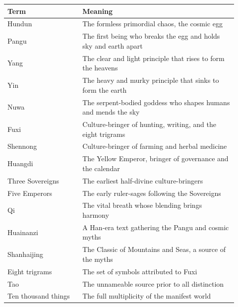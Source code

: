 \begin{longtable}{L{0.30\linewidth} L{0.62\linewidth}}
\toprule
\textbf{Term} & \textbf{Meaning} \\
\midrule
\endhead
Hundun & The formless primordial chaos, the cosmic egg \\
Pangu & The first being who breaks the egg and holds sky and earth apart \\
Yang & The clear and light principle that rises to form the heavens \\
Yin & The heavy and murky principle that sinks to form the earth \\
Nuwa & The serpent-bodied goddess who shapes humans and mends the sky \\
Fuxi & Culture-bringer of hunting, writing, and the eight trigrams \\
Shennong & Culture-bringer of farming and herbal medicine \\
Huangdi & The Yellow Emperor, bringer of governance and the calendar \\
Three Sovereigns & The earliest half-divine culture-bringers \\
Five Emperors & The early ruler-sages following the Sovereigns \\
Qi & The vital breath whose blending brings harmony \\
Huainanzi & A Han-era text gathering the Pangu and cosmic myths \\
Shanhaijing & The Classic of Mountains and Seas, a source of the myths \\
Eight trigrams & The set of symbols attributed to Fuxi \\
Tao & The unnameable source prior to all distinction \\
Ten thousand things & The full multiplicity of the manifest world \\
\bottomrule
\end{longtable}
